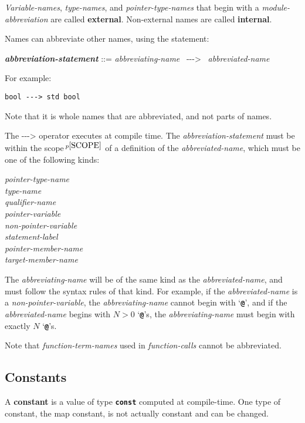 \documentclass[12pt]{article}
\newcommand{\TT}[1]{{\tt \bfseries #1}}
\newcommand{\ABV}{-{}-{}->}
\newcommand{\key}[1]{{\rm \bfseries #1}}
\newcommand{\ttkey}[1]{{\tt \bfseries #1}}
\newcommand{\emkey}[1]{{\em \bfseries #1}}
\newcommand{\pagnote}[1]{$\,^{p\pageref{#1}}$}
\newenvironment{indpar}[1][0.3in]%
	{\begin{list}{}%
		     {\setlength{\itemsep}{0in}%
		      \setlength{\topsep}{0in}%
		      \setlength{\parsep}{1ex}%
		      \setlength{\labelwidth}{#1}%
		      \setlength{\leftmargin}{#1}%
		      \addtolength{\leftmargin}{\labelsep}}%
	 \item}%
	{\end{list}}
\begin{document}
{\em Variable-names}, {\em type-names}, and {\em pointer-type-names}
that begin with a {\em module-abbreviation} are called
\key{external}\label{EXTERNAL-NAME}.
Non-external names are called \key{internal}\label{INTERNAL-NAME}.

Names can abbreviate other names, using the statement:
\begin{indpar}
\emkey{abbreviation-statement}\label{ABBREVIATION-STATEMENT} ::=
    {\em abbreviating-name}~ \ABV{}~ {\em abbreviated-name}
\end{indpar}
For example:
\begin{center}
\tt bool \ABV{} std bool
\end{center}

Note that it is whole names that are abbreviated, and not parts of
names.

The \ABV{} operator executes at compile time.  The {\em abbreviation-statement}
must be within the scope\pagnote{SCOPE}
of a definition of the {\em abbreviated-name},
which must be one of the following kinds:
\begin{center} \em
pointer-type-name \\
type-name \\
qualifier-name \\
pointer-variable \\
non-pointer-variable \\
statement-label \\
pointer-member-name \\
target-member-name
\end{center}
The {\em abbreviating-name} will be of the same kind as the
{\em abbreviated-name}, and must follow the syntax rules of that
kind.  For example, if the {\em abbreviated-name}
is a {\em non-pointer-variable}, the {\em abbreviating-name} cannot begin with
`\TT{@}', and if the {\em abbreviated-name} begins with $N>0$ `\TT{@}'s,
the {\em abbreviating-name} must begin with exactly $N$ `\TT{@}'s.

Note that {\em function-term-names} used in {\em function-calls}
cannot be abbreviated.


\subsection{Constants}
\label{CONSTANTS}

A \key{constant} is a value of type \ttkey{const} computed at
compile-time.  One type of constant, the map constant, is not
actually constant and can be changed.
\end{document}
